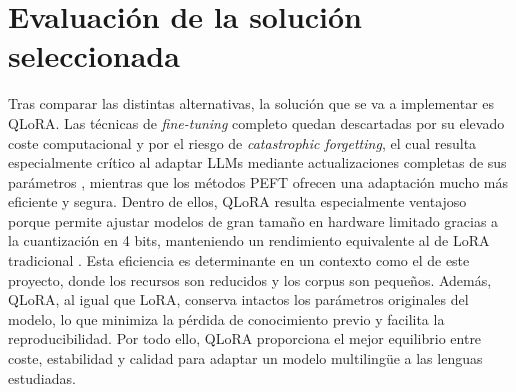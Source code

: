 \section{Evaluación de la solución seleccionada}

Tras comparar las distintas alternativas, la solución que se va a implementar es QLoRA. Las técnicas de \textit{fine-tuning} completo quedan descartadas por su elevado coste computacional y por el riesgo de \textit{catastrophic forgetting}, el cual resulta especialmente crítico al adaptar LLMs mediante actualizaciones completas de sus parámetros \cite{luo2023an}, mientras que los métodos PEFT ofrecen una adaptación mucho más eficiente y segura. Dentro de ellos, QLoRA resulta especialmente ventajoso porque permite ajustar modelos de gran tamaño en hardware limitado gracias a la cuantización en 4 bits, manteniendo un rendimiento equivalente al de LoRA tradicional \cite{dettmers2023qlora}. Esta eficiencia es determinante en un contexto como el de este proyecto, donde los recursos son reducidos y los corpus son pequeños. Además, QLoRA, al igual que LoRA, conserva intactos los parámetros originales del modelo, lo que minimiza la pérdida de conocimiento previo y facilita la reproducibilidad. Por todo ello, QLoRA proporciona el mejor equilibrio entre coste, estabilidad y calidad para adaptar un modelo multilingüe a las lenguas estudiadas.

